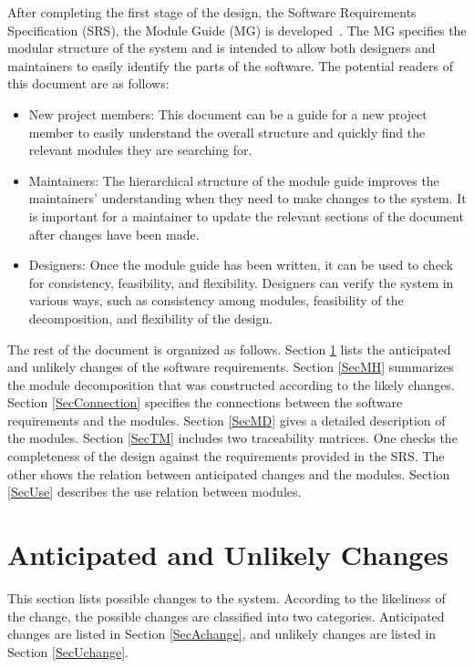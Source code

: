 \documentclass[12pt, titlepage]{article}
\begin{document}
After completing the first stage of the design, the Software Requirements Specification (SRS), the
Module Guide (MG) is developed~\citep{ParnasEtAl1984}. The MG specifies the modular structure of
the system and is intended to allow both designers and maintainers to easily identify the parts of
the software. The potential readers of this document are as follows:

\begin{itemize}
	\item New project members: This document can be a guide for a new project member to easily understand the
	      overall structure and quickly find the relevant modules they are searching for.
	\item Maintainers: The hierarchical structure of the module guide improves the maintainers' understanding
	      when they need to make changes to the system. It is important for a maintainer to update the
	      relevant sections of the document after changes have been made.
	\item Designers: Once the module guide has been written, it can be used to check for consistency,
	      feasibility, and flexibility. Designers can verify the system in various ways, such as consistency
	      among modules, feasibility of the decomposition, and flexibility of the design.
\end{itemize}

The rest of the document is organized as follows. Section \ref{SecChange} lists the anticipated and
unlikely changes of the software requirements. Section \ref{SecMH} summarizes the module
decomposition that was constructed according to the likely changes. Section \ref{SecConnection}
specifies the connections between the software requirements and the modules. Section \ref{SecMD}
gives a detailed description of the modules. Section \ref{SecTM} includes two traceability
matrices. One checks the completeness of the design against the requirements provided in the SRS.
The other shows the relation between anticipated changes and the modules. Section \ref{SecUse}
describes the use relation between modules.

\section{Anticipated and Unlikely Changes} \label{SecChange}

This section lists possible changes to the system. According to the likeliness of the change, the
possible changes are classified into two categories. Anticipated changes are listed in Section
\ref{SecAchange}, and unlikely changes are listed in Section \ref{SecUchange}.
\end{document}
